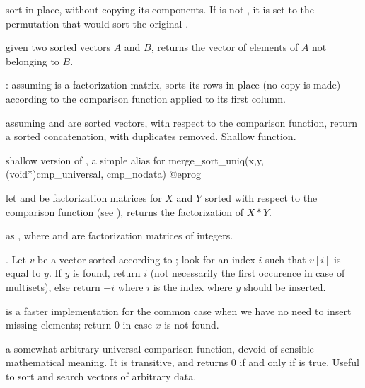  sort  in place, without copying its components. If
 is not , it is set to the permutation that would sort
the original .

 given two sorted
vectors $A$ and $B$, returns the vector of elements of $A$ not belonging to
$B$.

:
assuming  is a factorization matrix, sorts its rows in place (no copy
is made) according to the comparison function  applied to its first
column.

assuming  and  are sorted vectors, with respect to the 
comparison function, return a sorted concatenation, with duplicates removed.
Shallow function.

 shallow version of , a
simple alias for
\bprog
  merge_sort_uniq(x,y, (void*)cmp_universal, cmp_nodata)
@eprog

let  and  be factorization matrices for $X$ and $Y$
sorted with respect to the comparison function  (see
), returns the factorization of $X * Y$.

as , where  and  are factorization matrices of
integers.

.\hfil\break
Let $v$ be a vector sorted according to ; look for an
index $i$ such that  $v[i]$ is equal to $y$. If $y$ is found, return $i$
(not necessarily the first occurence in case of multisets), else return $-i$
where $i$ is the index where $y$ should be inserted.

 is a faster
implementation for the common case 
when we have no need to insert missing elements; return $0$ in case $x$
is not found.


 a somewhat arbitrary universal
comparison function, devoid of sensible mathematical meaning. It is
transitive, and returns 0 if and only if  is true.
Useful to sort and search vectors of arbitrary data.

